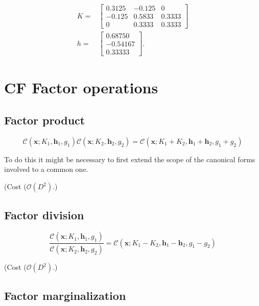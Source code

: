 \begin{align*}
K= & \left[\begin{array}{rrr}
0.3125 & -0.125 & 0\\
-0.125 & 0.5833 & 0.3333\\
0 & 0.3333 & 0.3333
\end{array}\right]\\
h= & \left[\begin{array}{r}
0.68750\\
-0.54167\\
0.33333
\end{array}\right].
\end{align*}



\section{CF Factor operations \cite[p 610]{Koller2009}}


\subsection{Factor product}

\begin{equation}
\mathcal{C}(\mathbf{x};K_{1},\mathbf{h}_{1}, g_1)\mathcal{C}(\mathbf{x};K_{2},\mathbf{h}_{2}, g_2)=\mathcal{C}(\mathbf{x};K_{1}+K_{2},\mathbf{h}_{1}+\mathbf{h}_{2}, g_1+g_2)\label{eq:cfprod}
\end{equation}


To do this it might be necessary to first extend the scope of the
canonical forms involved to a common one.

(Cost ($\mathcal{O}(D^{2})$.)


\subsection{Factor division}

\begin{equation}
\frac{\mathcal{C}(\mathbf{x};K_{1},\mathbf{h}_{1}, g_1)}{\mathcal{C}(\mathbf{x};K_{2},\mathbf{h}_{2}, g_2)}=\mathcal{C}(\mathbf{x};K_{1}-K_{2},\mathbf{h}_{1}-\mathbf{h}_{2}, g_1-g_2)\label{eq:cfdiv}
\end{equation}


(Cost ($\mathcal{O}(D^{2})$.)


\subsection{Factor marginalization}


